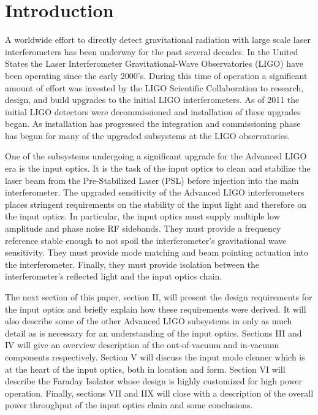 
\section{Introduction}

A worldwide effort to directly detect gravitational radiation with large scale laser interferometers 
has been underway for the past several decades.  
In the United States the Laser Interferometer Gravitational-Wave Observatories (LIGO) have been operating
since the early 2000's.  
During this time of operation a significant amount of effort was invested by the LIGO Scientific Collaboration 
to research, design, and build upgrades to the initial LIGO interferometers.  
As of 2011 the initial LIGO detectors were decommissioned and installation of these upgrades began.  
As installation has progressed the integration and commissioning phase has begun for many of the 
upgraded subsystems at the LIGO observatories.  

One of the subsystems undergoing a significant upgrade for the Advanced LIGO era is 
the input optics.  
It is the task of the input optics to clean and stabilize the laser beam from the 
Pre-Stabilized Laser (PSL) before injection into the main interferometer.  
The upgraded sensitivity of the Advanced LIGO interferometers places stringent requirements on 
the stability of the input light and therefore on the input optics.  
In particular, the input optics must supply multiple low amplitude and phase noise RF sidebands.  
They must provide a frequency reference stable enough to not spoil the interferometer's 
gravitational wave sensitivity.  
They must provide mode matching and beam pointing actuation into the interferometer.  
Finally, they must provide isolation between the interferometer's reflected light and the 
input optics chain.  

The next section of this paper, section II, will present the design requirements for the input optics and 
briefly explain how these requirements were derived.  
It will also describe some of the other Advanced LIGO subsystems in only as much detail as 
is necessary for an understanding of the input optics.  
Sections III and IV will give an overview description of the out-of-vacuum and in-vacuum 
components respectively.  
Section V will discuss the input mode cleaner which is at the heart of the input optics, 
both in location and form.  
Section VI will describe the Faraday Isolator whose design is highly customized for high power 
operation.  
Finally, sections VII and IIX will close with a description of the overall power throughput of the 
input optics chain and some conclusions.  

